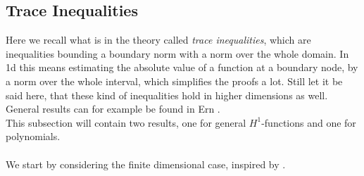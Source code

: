 \subsection{Trace Inequalities}
Here we recall what is in the theory called \textit{trace inequalities}, which are inequalities bounding a boundary norm with a norm over the whole domain.
In 1d this means estimating the absolute value of a function at a boundary node, by a norm over the whole interval, which simplifies the proofs a lot. 
Still let it be said here, that these kind of inequalities hold in higher dimensions as well. General results can for example be found in Ern \cite{diPietro2012}. \\
This subsection will contain two results, one for general $H^1$-functions and one for polynomials.
\\ \\
We start by considering the finite dimensional case, inspired by \cite{warburtonHesthaven2003ineq}.

